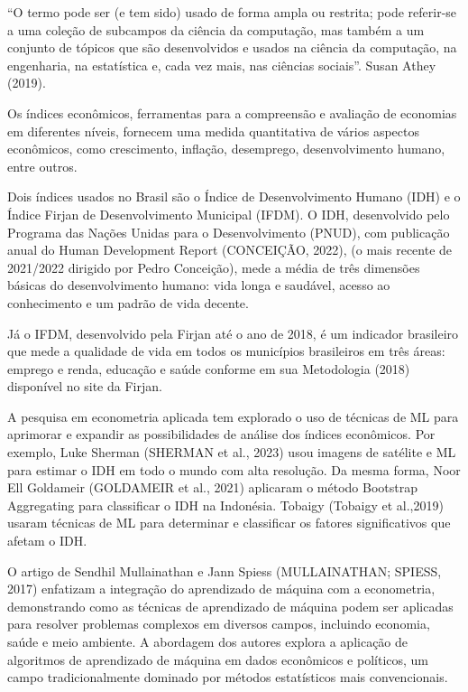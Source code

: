 \documentclass[
]{article}
\begin{document}
``O termo pode ser (e tem sido) usado de forma ampla ou restrita; pode
referir-se a uma coleção de subcampos da ciência da computação, mas
também a um conjunto de tópicos que são desenvolvidos e usados na
ciência da computação, na engenharia, na estatística e, cada vez mais,
nas ciências sociais''. Susan Athey (2019).

Os índices econômicos, ferramentas para a compreensão e avaliação de
economias em diferentes níveis, fornecem uma medida quantitativa de
vários aspectos econômicos, como crescimento, inflação, desemprego,
desenvolvimento humano, entre outros.

Dois índices usados no Brasil são o Índice de Desenvolvimento Humano
(IDH) e o Índice Firjan de Desenvolvimento Municipal (IFDM). O IDH,
desenvolvido pelo Programa das Nações Unidas para o Desenvolvimento
(PNUD), com publicação anual do Human Development Report (CONCEIÇÃO,
2022), (o mais recente de 2021/2022 dirigido por Pedro Conceição), mede
a média de três dimensões básicas do desenvolvimento humano: vida longa
e saudável, acesso ao conhecimento e um padrão de vida decente.

Já o IFDM, desenvolvido pela Firjan até o ano de 2018, é um indicador
brasileiro que mede a qualidade de vida em todos os municípios
brasileiros em três áreas: emprego e renda, educação e saúde conforme em
sua Metodologia (2018) disponível no site da Firjan.

A pesquisa em econometria aplicada tem explorado o uso de técnicas de ML
para aprimorar e expandir as possibilidades de análise dos índices
econômicos. Por exemplo, Luke Sherman (SHERMAN et al., 2023) usou
imagens de satélite e ML para estimar o IDH em todo o mundo com alta
resolução. Da mesma forma, Noor Ell Goldameir (GOLDAMEIR et al., 2021)
aplicaram o método Bootstrap Aggregating para classificar o IDH na
Indonésia. Tobaigy (Tobaigy et al.,2019) usaram técnicas de ML para
determinar e classificar os fatores significativos que afetam o IDH.

O artigo de Sendhil Mullainathan e Jann Spiess (MULLAINATHAN; SPIESS,
2017) enfatizam a integração do aprendizado de máquina com a
econometria, demonstrando como as técnicas de aprendizado de máquina
podem ser aplicadas para resolver problemas complexos em diversos
campos, incluindo economia, saúde e meio ambiente. A abordagem dos
autores explora a aplicação de algoritmos de aprendizado de máquina em
dados econômicos e políticos, um campo tradicionalmente dominado por
métodos estatísticos mais convencionais.
\end{document}
